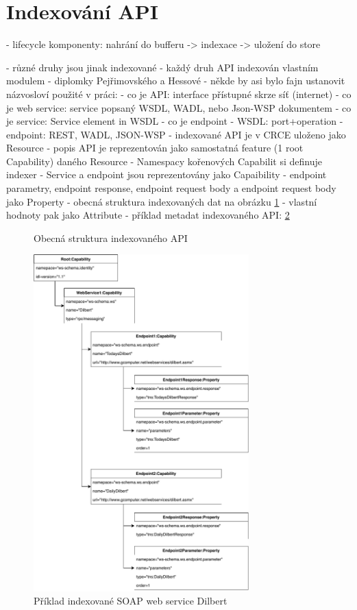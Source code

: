 \documentclass[czech,DP]{thesiskiv}
\begin{document}
\section{Indexování API}
\label{sec:api-index}

- lifecycle komponenty: nahrání do bufferu -> indexace -> uložení do store

- různé druhy jsou jinak indexované
- každý druh API indexován vlastním modulem - diplomky Pejřimovského \cite{pejrimovsky2015ws} a Hessové \cite{hessova2015rest}
- někde by asi bylo fajn ustanovit názvosloví použité v práci:
	- co je API: interface přístupné skrze síť (internet)
	- co je web service: service popsaný WSDL, WADL, nebo Json-WSP dokumentem
	- co je service: Service element in WSDL
	- co je endpoint
		- WSDL: port+operation
		- endpoint: REST, WADL, JSON-WSP
- indexované API je v CRCE uloženo jako Resource		
- popis API je reprezentován jako samostatná feature (1 root Capability) daného Resource
	- Namespacy kořenových Capabilit si definuje indexer
- Service a endpoint jsou reprezentovány jako Capaibility
- endpoint parametry, endpoint response, endpoint request body a endpoint request body jako Property
	- obecná struktura indexovaných dat na obrázku \ref{fig:indexed-api-general}
- vlastní hodnoty pak jako Attribute
- příklad metadat indexovaného API: \ref{fig:indexed-api-example}

\begin{figure}[h]
	\centering
	\caption{Obecná struktura indexovaného API}
	\label{fig:indexed-api-general}
\end{figure}

 \begin{figure}[h]
	\centering
	\includegraphics[height=13cm]{indexed-api-example}
	\caption{Příklad indexované SOAP web service Dilbert }
	\label{fig:indexed-api-example}
\end{figure}
\end{document}
